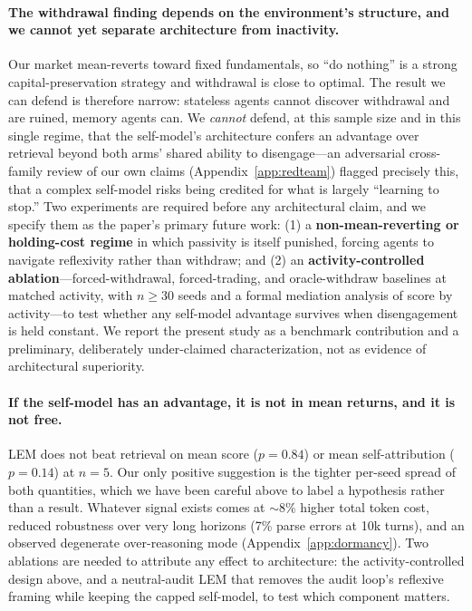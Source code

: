 \documentclass{article}
\begin{document}
\paragraph{The withdrawal finding depends on the environment's structure, and we cannot yet separate architecture from inactivity.} Our market mean-reverts toward fixed fundamentals, so ``do nothing'' is a strong capital-preservation strategy and withdrawal is close to optimal. The result we can defend is therefore narrow: stateless agents cannot discover withdrawal and are ruined, memory agents can. We \emph{cannot} defend, at this sample size and in this single regime, that the self-model's architecture confers an advantage over retrieval beyond both arms' shared ability to disengage---an adversarial cross-family review of our own claims (Appendix~\ref{app:redteam}) flagged precisely this, that a complex self-model risks being credited for what is largely ``learning to stop.'' Two experiments are required before any architectural claim, and we specify them as the paper's primary future work: (1) a \textbf{non-mean-reverting or holding-cost regime} in which passivity is itself punished, forcing agents to navigate reflexivity rather than withdraw; and (2) an \textbf{activity-controlled ablation}---forced-withdrawal, forced-trading, and oracle-withdraw baselines at matched activity, with $n\geq30$ seeds and a formal mediation analysis of score by activity---to test whether any self-model advantage survives when disengagement is held constant. We report the present study as a benchmark contribution and a preliminary, deliberately under-claimed characterization, not as evidence of architectural superiority.

\paragraph{If the self-model has an advantage, it is not in mean returns, and it is not free.} LEM does not beat retrieval on mean score ($p=0.84$) or mean self-attribution ($p=0.14$) at $n=5$. Our only positive suggestion is the tighter per-seed spread of both quantities, which we have been careful above to label a hypothesis rather than a result. Whatever signal exists comes at ${\sim}8\%$ higher total token cost, reduced robustness over very long horizons (7\% parse errors at 10k turns), and an observed degenerate over-reasoning mode (Appendix~\ref{app:dormancy}). Two ablations are needed to attribute any effect to architecture: the activity-controlled design above, and a neutral-audit LEM that removes the audit loop's reflexive framing while keeping the capped self-model, to test which component matters.
\end{document}
